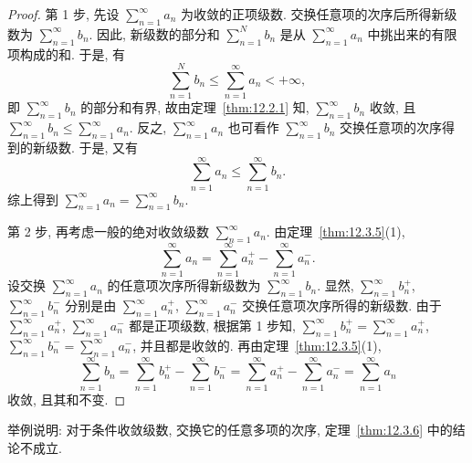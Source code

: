\begin{proof}
第 1 步, 先设 $\sum_{n=1}^{\infty}a_{n}$ 为收敛的正项级数. 交换任意项的次序后所得新级数为 $\sum_{n=1}^{\infty}b_{n}$. 因此, 新级数的部分和 $\sum_{n=1}^{N}b_{n}$ 是从 $\sum_{n=1}^{\infty}a_{n}$ 中挑出来的有限项构成的和. 于是, 有
\[
  \sum_{n=1}^{N}b_{n}\leqslant\sum_{n=1}^{\infty}a_{n}<+\infty,
\]
即 $\sum_{n=1}^{\infty}b_{n}$ 的部分和有界, 故由定理~\ref{thm:12.2.1} 知, $\sum_{n=1}^{\infty}b_{n}$ 收敛, 且 $\sum_{n=1}^{\infty}b_{n}\leqslant\sum_{n=1}^{\infty}a_{n}$. 反之, $\sum_{n=1}^{\infty}a_{n}$ 也可看作 $\sum_{n=1}^{\infty}b_{n}$ 交换任意项的次序得到的新级数. 于是, 又有
\[
  \sum_{n=1}^{\infty}a_{n}\leqslant\sum_{n=1}^{\infty}b_{n}.
\]
综上得到 $\sum_{n=1}^{\infty}a_{n}=\sum_{n=1}^{\infty}b_{n}$.

第 2 步, 再考虑一般的绝对收敛级数 $\sum_{n=1}^{\infty}a_{n}$. 由定理~\ref{thm:12.3.5}(1),
\[
  \sum_{n=1}^{\infty}a_{n}=\sum_{n=1}^{\infty}a_{n}^{+}-\sum_{n=1}^{\infty}a_{n}^{-}.
\]
设交换 $\sum_{n=1}^{\infty}a_{n}$ 的任意项次序所得新级数为 $\sum_{n=1}^{\infty}b_{n}$. 显然, $\sum_{n=1}^{\infty}b_{n}^{+}$, $\sum_{n=1}^{\infty}b_{n}^{-}$ 分别是由 $\sum_{n=1}^{\infty}a_{n}^{+}$, $\sum_{n=1}^{\infty}a_{n}^{-}$ 交换任意项次序所得的新级数. 由于 $\sum_{n=1}^{\infty}a_{n}^{+}$, $\sum_{n=1}^{\infty}a_{n}^{-}$ 都是正项级数, 根据第 1 步知, $\sum_{n=1}^{\infty}b_{n}^{+}=\sum_{n=1}^{\infty}a_{n}^{+}$, $\sum_{n=1}^{\infty}b_{n}^{-}=\sum_{n=1}^{\infty}a_{n}^{-}$, 并且都是收敛的. 再由定理~\ref{thm:12.3.5}(1),
\[
  \sum_{n=1}^{\infty}b_{n}=\sum_{n=1}^{\infty}b_{n}^{+}-\sum_{n=1}^{\infty}b_{n}^{-}
  =\sum_{n=1}^{\infty}a_{n}^{+}-\sum_{n=1}^{\infty}a_{n}^{-}=\sum_{n=1}^{\infty}a_{n}
\]
收敛, 且其和不变.
\end{proof}

\begin{example}\label{ex:12.3.6}
举例说明: 对于条件收敛级数, 交换它的任意多项的次序, 定理~\ref{thm:12.3.6} 中的结论不成立.
\end{example}

